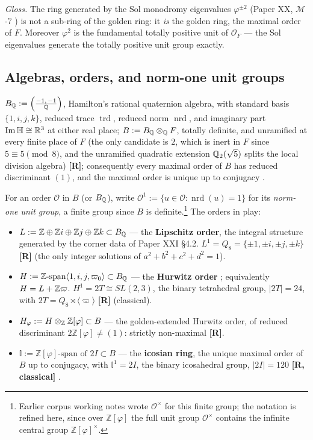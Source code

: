 \documentclass[11pt,a4paper]{article}
\theoremstyle{plain}
\theoremstyle{definition}
\theoremstyle{remark}
\newcommand{\HH}{\mathbb{H}}
\newcommand{\Ico}{\mathbb{I}}
\newcommand{\Zphi}{\mathbb{Z}[\varphi]}
\newcommand{\rtag}[1]{\textnormal{\textbf{[#1]}}}
\DeclareMathOperator{\trd}{trd}
\DeclareMathOperator{\nrd}{nrd}
\DeclareMathOperator{\ImH}{Im}
\begin{document}
\noindent\emph{Gloss.} The ring generated by the Sol monodromy eigenvalues $\varphi^{\pm2}$ (Paper XX, $\mathcal{M}$-7 \cite{PaperXX}) is not a sub-ring of the golden ring: it \emph{is} the golden ring, the maximal order of $F$. Moreover $\varphi^2$ is the fundamental totally positive unit of $\mathcal{O}_F$ --- the Sol eigenvalues generate the totally positive unit group exactly.

\subsection{Algebras, orders, and norm-one unit groups}\label{sec:orders}

$B_{\mathbb{Q}} := \left(\frac{-1,\,-1}{\mathbb{Q}}\right)$, Hamilton's rational quaternion algebra, with standard basis $\{1,i,j,k\}$, reduced trace $\trd$, reduced norm $\nrd$, and imaginary part $\ImH\HH \cong \R^3$ at either real place; $B := B_{\mathbb{Q}} \otimes_{\mathbb{Q}} F$, totally definite, and unramified at every finite place of $F$ (the only candidate is $2$, which is inert in $F$ since $5 \equiv 5 \pmod 8$, and the unramified quadratic extension $\mathbb{Q}_2(\sqrt5)$ splits the local division algebra) \rtag{R}; consequently every maximal order of $B$ has reduced discriminant $(1)$, and the maximal order is unique up to conjugacy \cite{Vigneras, Tits}.

For an order $\mathcal{O}$ in $B$ (or $B_{\mathbb{Q}}$), write $\mathcal{O}^1 := \{u \in \mathcal{O} : \nrd(u) = 1\}$ for its \emph{norm-one unit group}, a finite group since $B$ is definite.\footnote{Earlier corpus working notes wrote $\mathcal{O}^\times$ for this finite group; the notation is refined here, since over $\Zphi$ the full unit group $\mathcal{O}^\times$ contains the infinite central group $\Zphi^\times$.} The orders in play:
\begin{itemize}[leftmargin=2em]
\item $L := \mathbb{Z} \oplus \mathbb{Z} i \oplus \mathbb{Z} j \oplus \mathbb{Z} k \subset B_{\mathbb{Q}}$ --- the \textbf{Lipschitz order}, the integral structure generated by the corner data of Paper XXI \S4.2. $L^1 = Q_8 = \{\pm1, \pm i, \pm j, \pm k\}$ \rtag{R} (the only integer solutions of $a^2+b^2+c^2+d^2 = 1$).
\item $H := \mathbb{Z}\text{-span}\langle 1, i, j, \varpi_0\rangle \subset B_{\mathbb{Q}}$ --- the \textbf{Hurwitz order} \cite{Hurwitz}; equivalently $H = L + \mathbb{Z}\varpi$. $H^1 = 2T \cong SL(2,3)$, the binary tetrahedral group, $|2T| = 24$, with $2T = Q_8 \rtimes \langle\varpi\rangle$ \rtag{R} (classical).
\item $H_\varphi := H \otimes_\Z \Zphi \subset B$ --- the golden-extended Hurwitz order, of reduced discriminant $2\Zphi \neq (1)$: strictly non-maximal \rtag{R}.
\item $\Ico := \Zphi\text{-span of } 2I \subset B$ --- the \textbf{icosian ring}, the unique maximal order of $B$ up to conjugacy, with $\Ico^1 = 2I$, the binary icosahedral group, $|2I| = 120$ \rtag{R, classical} \cite{ConwaySloane, Tits, Vigneras}.
\end{itemize}
\end{document}
